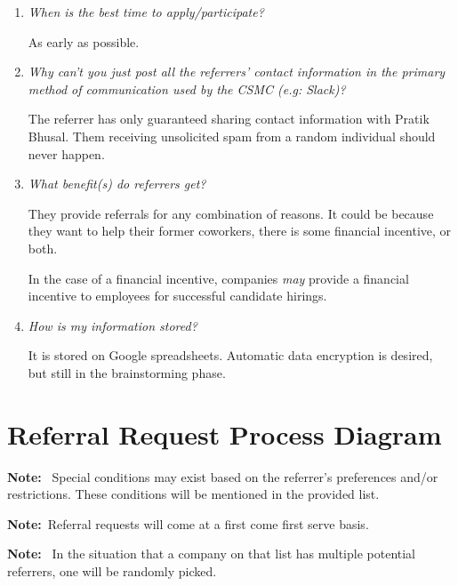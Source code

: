 \documentclass[letterpaper, 12pt]{article}
\newcommand{\QA}[2]{\textit{#1}\medskip

    #2\bigskip
}
\newcommand{\note}[1]{\textbf{Note:}~#1}
\begin{document}
\begin{enumerate}[leftmargin=*]
    \item\QA%
        {When is the best time to apply/participate?}
        {As early as possible.}
    \item\QA%
        {%
            Why can't you just post all the referrers' contact information in
            the primary method of communication used by the CSMC (e.g: Slack)?
        }
        {%
            The referrer has only guaranteed sharing contact information with
            Pratik Bhusal. Them receiving unsolicited spam from a random
            individual should never happen.
        }
    \item\QA%
        {%
            What benefit(s) do referrers get?
        }
        {%
            They provide referrals for any combination of reasons. It could be
            because they want to help their former coworkers, there is some
            financial incentive, or both.

            In the case of a financial incentive, companies \textit{may} provide
            a financial incentive to employees for successful candidate hirings.
        }
    \item\QA%
        {How is my information stored?}
        {%
            It is stored on Google spreadsheets. Automatic data encryption is
            desired, but still in the brainstorming phase.
        }
\end{enumerate}


\section{Referral Request Process Diagram}

\label{fig:requestProcess}

\note{%
    Special conditions may exist based on the referrer's preferences and/or
    restrictions. These conditions will be mentioned in the provided list.
}

\note{Referral requests will come at a first come first serve basis.}

\note{%
    In the situation that a company on that list has multiple potential
    referrers, one will be randomly picked.
}
\end{document}
